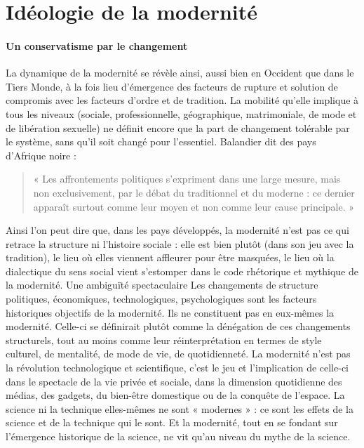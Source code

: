 \section{Idéologie de la modernité}

\paragraph{Un conservatisme par le changement}

La dynamique de la modernité se révèle ainsi, aussi bien en Occident que dans le Tiers Monde, à la fois lieu d'émergence des facteurs de rupture et solution de compromis avec les facteurs d'ordre et de tradition. La mobilité qu'elle implique à tous les niveaux (sociale, professionnelle, géographique, matrimoniale, de mode et de libération sexuelle) ne définit encore que la part de changement tolérable par le système, sans qu'il soit changé pour
l'essentiel. Balandier dit des pays d'Afrique noire : \begin{quote}
    « Les affrontements politiques s'expriment dans une large mesure, mais non exclusivement, par le débat du traditionnel et du moderne : ce dernier apparaît surtout comme leur moyen et non comme leur cause principale. » 
\end{quote}Ainsi l'on peut dire que, dans les pays développés, la modernité n'est pas ce qui retrace la structure ni l'histoire sociale : elle est bien plutôt (dans son jeu avec la tradition), le lieu où elles viennent affleurer pour être masquées, le lieu où la dialectique du sens social vient s'estomper dans le code rhétorique et mythique de la modernité.
Une ambiguïté spectaculaire
Les changements de structure politiques, économiques, technologiques, psychologiques sont les facteurs historiques objectifs de la modernité. Ils ne constituent pas en eux-mêmes la modernité. Celle-ci se définirait plutôt comme la dénégation de ces changements structurels, tout au moins comme leur réinterprétation en termes de style culturel, de mentalité, de mode de vie, de quotidienneté.
La modernité n'est pas la révolution technologique et scientifique, c'est le jeu et l'implication de celle-ci dans le spectacle de la vie privée et sociale, dans la dimension quotidienne des médias, des gadgets, du bien-être domestique ou de la conquête de l'espace. La science ni la technique elles-mêmes ne sont « modernes » : ce sont les effets de la science et de la technique qui le sont. Et la modernité, tout en se fondant sur l'émergence historique de la science, ne vit qu'au niveau du mythe de la science.
